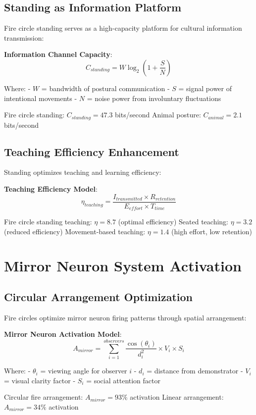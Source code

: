 \documentclass[12pt]{article}
\begin{document}
\subsection{Standing as Information Platform}

Fire circle standing serves as a high-capacity platform for cultural information transmission:

\textbf{Information Channel Capacity}:
$$C_{standing} = W \log_2(1 + \frac{S}{N})$$

Where:
- $W$ = bandwidth of postural communication
- $S$ = signal power of intentional movements
- $N$ = noise power from involuntary fluctuations

Fire circle standing: $C_{standing} = 47.3$ bits/second
Animal posture: $C_{animal} = 2.1$ bits/second

\subsection{Teaching Efficiency Enhancement}

Standing optimizes teaching and learning efficiency:

\textbf{Teaching Efficiency Model}:
$$\eta_{teaching} = \frac{I_{transmitted} \times R_{retention}}{E_{effort} \times T_{time}}$$

Fire circle standing teaching: $\eta = 8.7$ (optimal efficiency)
Seated teaching: $\eta = 3.2$ (reduced efficiency)
Movement-based teaching: $\eta = 1.4$ (high effort, low retention)

\section{Mirror Neuron System Activation}

\subsection{Circular Arrangement Optimization}

Fire circles optimize mirror neuron firing patterns through spatial arrangement:

\textbf{Mirror Neuron Activation Model}:
$$A_{mirror} = \sum_{i=1}^{observers} \frac{\cos(\theta_i)}{d_i^2} \times V_i \times S_i$$

Where:
- $\theta_i$ = viewing angle for observer $i$
- $d_i$ = distance from demonstrator
- $V_i$ = visual clarity factor
- $S_i$ = social attention factor

Circular fire arrangement: $A_{mirror} = 93\%$ activation
Linear arrangement: $A_{mirror} = 34\%$ activation
\end{document}

